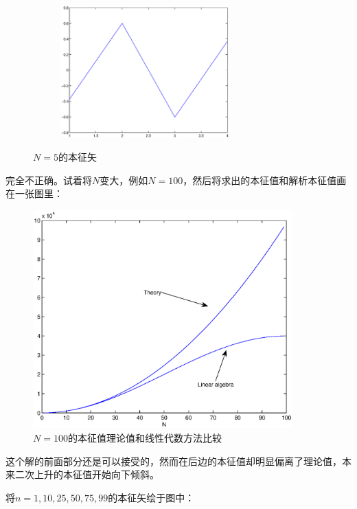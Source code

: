 \documentclass[paper=a4, fontsize=11pt]{scrartcl} %
\numberwithin{equation}{section} %
\numberwithin{figure}{section} %
\numberwithin{table}{section} %
\begin{document}
\begin{CJK*}{UTF8}{gbsn}
\begin{figure}[H]
\begin{subfigure}{70mm}
  \label{fig:sub1}
\end{subfigure}
\begin{subfigure}{70mm}
  \centering
  \includegraphics[width=65mm]{figure-1-1-4.eps}
  \label{fig:sub2}
\end{subfigure}
\caption{$N=5$的本征矢}
\label{fig:test}
\end{figure}
完全不正确。试着将$N$变大，例如$N=100$，然后将求出的本征值和解析本征值画在一张图里：
\begin{figure}[H]
\centering
\includegraphics[width=100mm]{figure-1-2-1.eps}
\caption{$N=100$的本征值理论值和线性代数方法比较}
\label{fig:test}
\end{figure}
这个解的前面部分还是可以接受的，然而在后边的本征值却明显偏离了理论值，本来二次上升的本征值开始向下倾斜。

将$n=1, 10, 25, 50, 75, 99$的本征矢绘于图中：


\end{CJK*}
\end{document}
